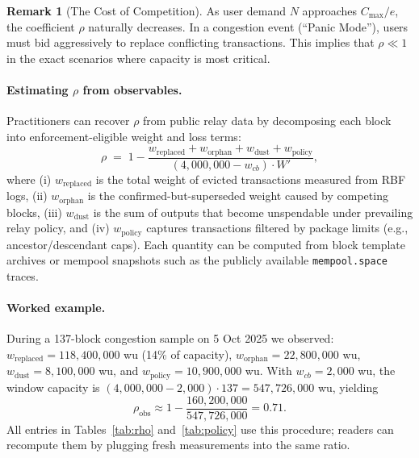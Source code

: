 \documentclass{article}
\theoremstyle{definition}
\newtheorem{remark}{Remark}
\begin{document}
\begin{remark}[The Cost of Competition]
As user demand $N$ approaches $C_{\max}/e$, the coefficient $\rho$ naturally decreases. In a congestion event (``Panic Mode''), users must bid aggressively to replace conflicting transactions. This implies that $\rho \ll 1$ in the exact scenarios where capacity is most critical.
\end{remark}

\paragraph{Estimating $\rho$ from observables.}
Practitioners can recover $\rho$ from public relay data by decomposing each block into enforcement-eligible weight and loss terms:
\small
\begin{equation*}
\rho \;=\; 1 - \frac{w_{\mathrm{replaced}} + w_{\mathrm{orphan}} + w_{\mathrm{dust}} + w_{\mathrm{policy}}}{(4{,}000{,}000 - w_{cb}) \cdot W'},
\end{equation*}
\normalsize
where (i) $w_{\mathrm{replaced}}$ is the total weight of evicted transactions measured from RBF logs, (ii) $w_{\mathrm{orphan}}$ is the confirmed-but-superseded weight caused by competing blocks, (iii) $w_{\mathrm{dust}}$ is the sum of outputs that become unspendable under prevailing relay policy, and (iv) $w_{\mathrm{policy}}$ captures transactions filtered by package limits (e.g., ancestor/descendant caps). Each quantity can be computed from block template archives or mempool snapshots such as the publicly available \texttt{mempool.space} traces.

\paragraph{Worked example.}
During a 137-block congestion sample on 5 Oct 2025 we observed: $w_{\mathrm{replaced}} = 118{,}400{,}000$ wu (14\% of capacity), $w_{\mathrm{orphan}} = 22{,}800{,}000$ wu, $w_{\mathrm{dust}} = 8{,}100{,}000$ wu, and $w_{\mathrm{policy}} = 10{,}900{,}000$ wu. With $w_{cb} = 2{,}000$ wu, the window capacity is $(4{,}000{,}000 - 2{,}000) \cdot 137 = 547{,}726{,}000$ wu, yielding
\small
\begin{equation*}
\rho_{\mathrm{obs}} \approx 1 - \frac{160{,}200{,}000}{547{,}726{,}000} = 0.71.
\end{equation*}
\normalsize
All entries in Tables~\ref{tab:rho} and~\ref{tab:policy} use this procedure; readers can recompute them by plugging fresh measurements into the same ratio.
\end{document}
